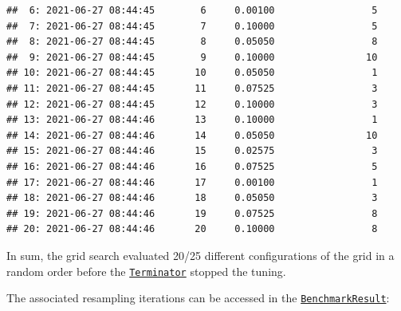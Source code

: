 \documentclass[
]{scrbook}
\newenvironment{Shaded}{\begin{snugshade}}{\end{snugshade}}
\newcommand{\NormalTok}[1]{#1}
\newcommand{\SpecialCharTok}[1]{\textcolor[rgb]{0.00,0.00,0.00}{#1}}
\renewenvironment{Shaded} {\begin{snugshade}\small} {\end{snugshade}}
\begin{document}
\begin{verbatim}
##  6: 2021-06-27 08:44:45        6     0.00100                 5
##  7: 2021-06-27 08:44:45        7     0.10000                 5
##  8: 2021-06-27 08:44:45        8     0.05050                 8
##  9: 2021-06-27 08:44:45        9     0.10000                10
## 10: 2021-06-27 08:44:45       10     0.05050                 1
## 11: 2021-06-27 08:44:45       11     0.07525                 3
## 12: 2021-06-27 08:44:45       12     0.10000                 3
## 13: 2021-06-27 08:44:46       13     0.10000                 1
## 14: 2021-06-27 08:44:46       14     0.05050                10
## 15: 2021-06-27 08:44:46       15     0.02575                 3
## 16: 2021-06-27 08:44:46       16     0.07525                 5
## 17: 2021-06-27 08:44:46       17     0.00100                 1
## 18: 2021-06-27 08:44:46       18     0.05050                 3
## 19: 2021-06-27 08:44:46       19     0.07525                 8
## 20: 2021-06-27 08:44:46       20     0.10000                 8
\end{verbatim}

In sum, the grid search evaluated 20/25 different configurations of the grid in a random order before the \href{https://bbotk.mlr-org.com/reference/Terminator.html}{\texttt{Terminator}} stopped the tuning.

The associated resampling iterations can be accessed in the \href{https://mlr3.mlr-org.com/reference/BenchmarkResult.html}{\texttt{BenchmarkResult}}:

\begin{Shaded}
\end{Shaded}
\end{document}
